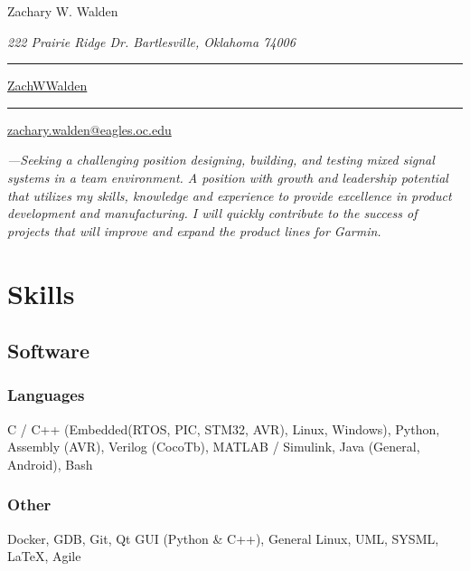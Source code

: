 \documentclass{article}
\newcommand\mybar{\kern1pt\rule[-\dp\strutbox]{.8pt}{\baselineskip}\kern1pt}
\begin{document}
\begin{center}
	\begin{Huge}
		Zachary W. Walden\\
	\end{Huge}
	\begin{large}
		\textsl{222 Prairie Ridge Dr. Bartlesville, Oklahoma 74006}\\
	\end{large}
	\begin{normalsize}
		 \mybar { } \faGithub \href{https://github.com/ZachWWalden}{ ZachWWalden}
		\mybar { }\faEnvelope\href{mailto::zachary.walden@eagles.oc.edu}{ zachary.walden@eagles.oc.edu}
	\end{normalsize}
\end{center}
\begin{spacing}{.5}

\begin{adjustwidth}{30pt}{30pt}
	\textit{\large{---Seeking a challenging position designing, building, and testing mixed signal systems in a team environment. A position with growth and leadership potential that utilizes my skills, knowledge and experience to provide excellence in product development and manufacturing.
	I will quickly contribute to the success of projects that will improve and expand the product lines for Garmin.}}
\end{adjustwidth}

\section{Skills}
	\subsection{Software}
		\subsubsection{Languages} \large{ C / C++} \small{(Embedded(RTOS, PIC, STM32, AVR), Linux, Windows),}\large{ Python, Assembly} \small{(AVR),} \large{ Verilog} \small{(CocoTb),} \hspace*{.45cm}\large{ MATLAB / Simulink, Java} \small{(General, Android),} \large{ Bash}
		\subsubsection{Other} \large{ Docker, GDB, Git, Qt GUI} \small{(Python \& C++),} \large{ General Linux, UML, SYSML, \LaTeX, Agile}

\end{spacing}
\end{document}
